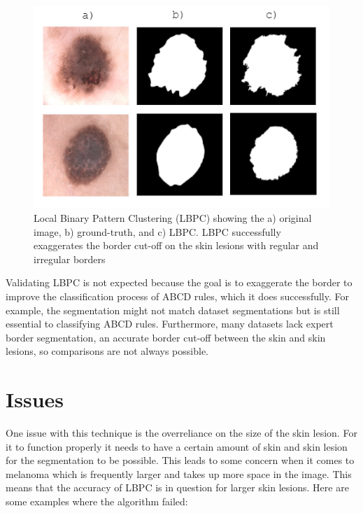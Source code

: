\begin{figure}
\centering
\includegraphics[scale=1.2]{images/borders.PNG}
\caption{Local Binary Pattern Clustering (LBPC) showing the a) original image, b) ground-truth, and c) LBPC. LBPC successfully exaggerates the border cut-off on the skin lesions with regular and irregular borders} 
\end{figure}\label{fractal1}

Validating LBPC is not expected because the goal is to exaggerate the border to improve the classification process of ABCD rules, which it does successfully\cite{Pereira2020, Kaya2016}. For example, the segmentation might not match dataset segmentations but is still essential to classifying ABCD rules. Furthermore, many datasets lack expert border segmentation, an accurate border cut-off between the skin and skin lesions, so comparisons are not always possible.

\section{Issues}
One issue with this technique is the overreliance on the size of the skin lesion. For it to function properly it needs to have a certain amount of skin and skin lesion for the segmentation to be possible. This leads to some concern when it comes to melanoma which is frequently larger and takes up more space in the image. This means that the accuracy of LBPC is in question for larger skin lesions. Here are some examples where the algorithm failed:

\begin{figure}
    \centering
    \caption{} 
\end{figure}\label{lbpc-issues}

